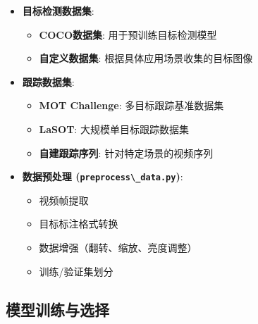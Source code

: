 \begin{itemize}
\tightlist
\item
  \textbf{目标检测数据集}:

  \begin{itemize}
  \tightlist
  \item
    \textbf{COCO数据集}: 用于预训练目标检测模型
  \item
    \textbf{自定义数据集}: 根据具体应用场景收集的目标图像
  \end{itemize}
\item
  \textbf{跟踪数据集}:

  \begin{itemize}
  \tightlist
  \item
    \textbf{MOT Challenge}: 多目标跟踪基准数据集
  \item
    \textbf{LaSOT}: 大规模单目标跟踪数据集
  \item
    \textbf{自建跟踪序列}: 针对特定场景的视频序列
  \end{itemize}
\item
  \textbf{数据预处理 (\passthrough{\lstinline!preprocess\_data.py!})}:

  \begin{itemize}
  \tightlist
  \item
    视频帧提取
  \item
    目标标注格式转换
  \item
    数据增强（翻转、缩放、亮度调整）
  \item
    训练/验证集划分
  \end{itemize}
\end{itemize}

\subsection{模型训练与选择}\label{ux6a21ux578bux8badux7ec3ux4e0eux9009ux62e9}

